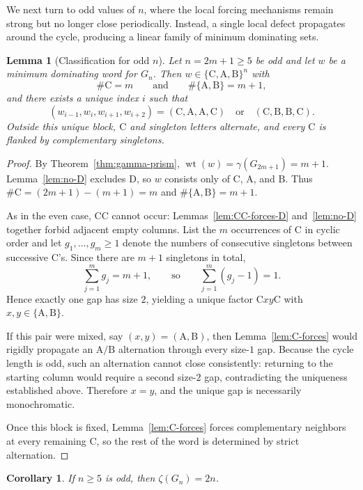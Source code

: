 \documentclass[11pt]{article}
\theoremstyle{plain}
\newtheorem{lemma}[theorem]{Lemma}
\newtheorem{corollary}[theorem]{Corollary}
\theoremstyle{definition}
\theoremstyle{remark}
\DeclareMathOperator{\wt}{wt}
\newcommand{\colA}{\mathrm{A}}
\newcommand{\colB}{\mathrm{B}}
\newcommand{\colC}{\mathrm{C}}
\newcommand{\colD}{\mathrm{D}}
\begin{document}
We next turn to odd values of $n$, where the local forcing mechanisms remain strong
but no longer close periodically.  Instead, a single local defect propagates around
the cycle, producing a linear family of minimum dominating sets.

\begin{lemma}[Classification for odd $n$]\label{lem:class-odd}
Let $n=2m+1\ge5$ be odd and let $w$ be a minimum dominating word for $G_n$.
Then $w\in\{\colC,\colA,\colB\}^n$ with
\[
\#\colC=m
\qquad\text{and}\qquad
\#\{\colA,\colB\}=m+1,
\]
and there exists a unique index $i$ such that
\[
(w_{i-1},w_i,w_{i+1},w_{i+2})
=(\colC,\colA,\colA,\colC)
\quad\text{or}\quad
(\colC,\colB,\colB,\colC).
\]
Outside this unique block, $\colC$ and singleton letters alternate, and every
$\colC$ is flanked by complementary singletons.
\end{lemma}

\begin{proof}
By Theorem~\ref{thm:gamma-prism}, $\wt(w)=\gamma(G_{2m+1})=m+1$.
Lemma~\ref{lem:no-D} excludes $\colD$, so $w$ consists only of $\colC$, $\colA$, and $\colB$.
Thus $\#\colC=(2m+1)-(m+1)=m$ and $\#\{\colA,\colB\}=m+1$.

As in the even case, $\colC\colC$ cannot occur: Lemmas~\ref{lem:CC-forces-D}
and~\ref{lem:no-D} together forbid adjacent empty columns.
List the $m$ occurrences of $\colC$ in cyclic order and let
$g_1,\dots,g_m\ge1$ denote the numbers of consecutive singletons between successive
$\colC$'s. Since there are $m+1$ singletons in total,
\[
\sum_{j=1}^m g_j=m+1,
\qquad\text{so}\qquad
\sum_{j=1}^m (g_j-1)=1.
\]
Hence exactly one gap has size $2$, yielding a unique factor
$\colC x y \colC$ with $x,y\in\{\colA,\colB\}$.

If this pair were mixed, say $(x,y)=(\colA,\colB)$, then Lemma~\ref{lem:C-forces}
would rigidly propagate an $\colA/\colB$ alternation through every size-$1$ gap.
Because the cycle length is odd, such an alternation cannot close consistently:
returning to the starting column would require a second size-$2$ gap, contradicting
the uniqueness established above. Therefore $x=y$, and the unique gap is necessarily
monochromatic.

Once this block is fixed, Lemma~\ref{lem:C-forces} forces complementary neighbors at
every remaining $\colC$, so the rest of the word is determined by strict alternation.
\end{proof}

\begin{corollary}\label{cor:count-odd}
If $n\ge5$ is odd, then $\zeta(G_n)=2n$.
\end{corollary}
\end{document}
